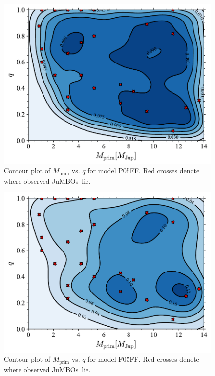 \documentclass[submission,phys]{lib/SciPost}
\newcommand{\jumbos}{\mbox{JuMBOs}}
\begin{document}
\begin{figure}
    \centering
        \includegraphics[width=\columnwidth]{figures/Plummer_rvir0.5_FF_mass_distr.pdf}
    \caption{Contour plot of $M_{\mathrm{prim}}$ vs. $q$ for model
      P05FF. Red crosses denote where observed \jumbos\, lie.}
         \label{Fig:Gen_mdistr_Plummer}
\end{figure}
   
\begin{figure}
    \centering
       \includegraphics[width=\columnwidth]{figures/Fractal_rvir0.5_FF_mass_distr.pdf}
    \caption{Contour plot of $M_{\mathrm{prim}}$ vs. $q$ for model
      F05FF. Red crosses denote where observed \jumbos\, lie.}
         \label{Fig:Gen_mdistr_Fractal}
\end{figure}
\end{document}
